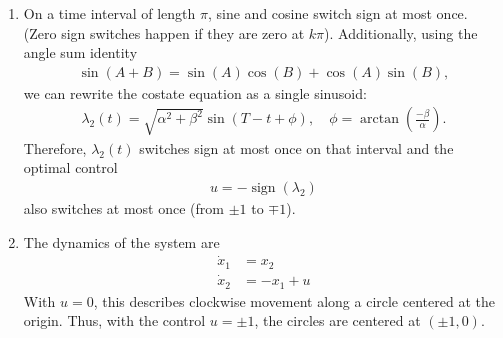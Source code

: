 \documentclass[letterpaper,11pt,titlepage]{article}
\DeclareMathOperator{\sign}{sign}
\begin{document}
\begin{enumerate}[leftmargin=0pt]
    \item On a time interval of length $\pi$, sine and cosine switch sign at most once. (Zero sign switches happen if they are zero at $k\pi$). Additionally, using the angle sum identity
        \begin{gather}
            \sin(A + B) = \sin(A)\cos(B) + \cos(A)\sin(B),
        \end{gather}
        we can rewrite the costate equation as a single sinusoid:
        \begin{gather}
            \lambda_2(t) = \sqrt{\alpha^2+\beta^2} \sin(T-t + \phi), \quad \phi = \arctan \left(\frac{-\beta}{\alpha}\right).
        \end{gather}
        Therefore, $\lambda_2(t)$ switches sign at most once on that interval and the optimal control
        \begin{gather}
            u = -\sign(\lambda_2)
        \end{gather}
        also switches at most once (from $\pm 1$ to $\mp 1$).

        \clearpage
    \item The dynamics of the system are
        \begin{align}
            \dot x_1 &= x_2 \\
            \dot x_2 &= -x_1 + u
        \end{align}
        With $u=0$, this describes clockwise movement along a circle centered at the origin. Thus, with the control $u=\pm 1$, the circles are centered at $(\pm1,0)$.

        \begin{center}
\end{center}
\end{enumerate}
\end{document}
